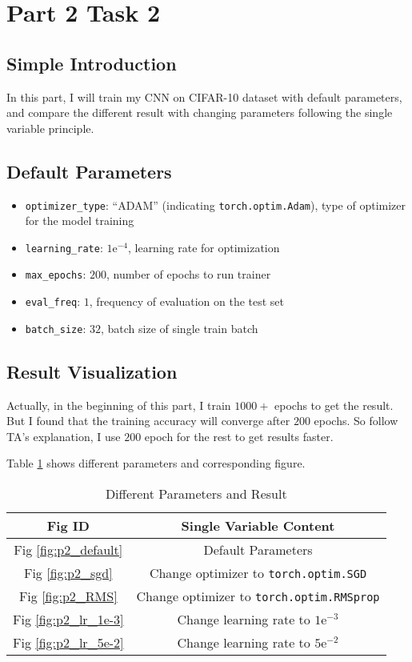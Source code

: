 \section{Part 2 Task 2}

\subsection{Simple Introduction}

In this part, I will train my CNN on CIFAR-10 dataset with default parameters, and compare the different result with changing parameters following the single variable principle.

\subsection{Default Parameters}

\begin{itemize}
    \item \texttt{optimizer\_type}: ``ADAM'' (indicating \texttt{torch.optim.Adam}), type of optimizer for the model training
    \item \texttt{learning\_rate}: $1\mathrm{e}^{-4}$, learning rate for optimization
    \item \texttt{max\_epochs}: $200$, number of epochs to run trainer
    \item \texttt{eval\_freq}: $1$, frequency of evaluation on the test set
    \item \texttt{batch\_size}: $32$, batch size of single train batch
\end{itemize}

\subsection{Result Visualization}

Actually, in the beginning of this part, I train $1000+$ epochs to get the result. But I found that the training accuracy will converge after $200$ epochs.
So follow TA's explanation, I use $200$ epoch for the rest to get results faster.

Table \ref{tab:p2_res_para} shows different parameters and corresponding figure.

\begin{table}[!h]
\centering\caption{Different Parameters and Result}
\label{tab:p2_res_para}
\begin{tabular}{|c|c|}
\hline
\textbf{Fig ID} & \textbf{Single Variable Content} \\
\hline
Fig \ref{fig:p2_default} & Default Parameters \\ \hline
Fig \ref{fig:p2_sgd} & Change optimizer to \texttt{torch.optim.SGD} \\ \hline
Fig \ref{fig:p2_RMS} & Change optimizer to \texttt{torch.optim.RMSprop} \\ \hline
Fig \ref{fig:p2_lr_1e-3} & Change learning rate to $1\mathrm{e}^{-3}$ \\ \hline
Fig \ref{fig:p2_lr_5e-2} & Change learning rate to $5\mathrm{e}^{-2}$ \\ \hline
\end{tabular}
\end{table}

